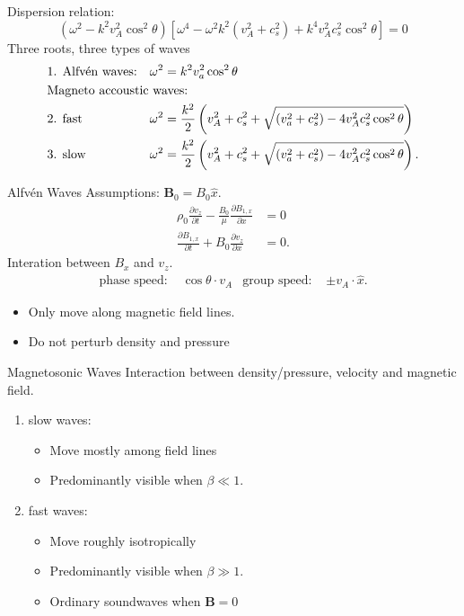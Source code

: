 \documentclass{beamer}
\begin{document}
\begin{frame}
    Dispersion relation:
        \begin{equation*}
	        (\omega^2 - k^2 v_A^2 \cos^2 \theta)\left[ \omega^{4} - \omega^2k^2(v_A^2 + c_s^2) + k^{4}v_A^2c_s^2\cos^2\theta \right]  = 0
        \end{equation*}
Three roots, three types of waves
\begin{align*}
&\text{1. Alfv\'en waves:}	& \omega^2 &= k^2 v_a^2 \cos^2 \theta\\
&\text{Magneto accoustic waves:}\hspace{-4cm}\\
&\text{2. fast} 
& \omega^2 &= \frac{k^2}{2}\left( v_A^2 + c_s^2 + \sqrt{(v_a^2 + c_s^2) - 4 v_A^2 c_s^2 \cos^2\theta}  \right) \\
& \text{3. slow} & 
	\omega^2 &= \frac{k^2}{2}\left( v_A^2 + c_s^2 + \sqrt{(v_a^2 + c_s^2) - 4 v_A^2 c_s^2 \cos^2\theta}  \right) 
.\end{align*}
\end{frame}
\begin{frame}{Alfv\'en Waves}
	Assumptions: $\mathbf B_0 = B_0 \hat{x}$. 
	\begin{align*}
		\rho_0 \frac{\partial v_z}{\partial t}  - \frac{B_0}{\mu}\frac{\partial B_{1, x}}{\partial x}  &= 0 \\
		\frac{\partial B_{1,x}}{\partial t}  + B_0 \frac{\partial v_z}{\partial x} &= 0 
	.\end{align*}
	Interation between $B_x$ and $v_z$. 
	\begin{align*}
		\text{phase speed: } & \cos\theta \cdot v_A & \text{group speed: } & \pm v_A \cdot \hat{x}
	.\end{align*}
	\begin{itemize}
		\item Only move along magnetic field lines.
		\item Do not perturb density and pressure
	\end{itemize}
\end{frame}
\begin{frame}{Magnetosonic Waves}
	Interaction between density/pressure, velocity and magnetic field. 
	\begin{enumerate}
		\item slow waves:
			\begin{itemize}
				\item Move mostly among field lines
				\item Predominantly visible when $\beta \ll 1$.
			\end{itemize}
		\item fast waves:
			\begin{itemize}
				\item Move roughly isotropically 
				\item Predominantly visible when $\beta \gg 1$.
				\item Ordinary soundwaves when $\mathbf B = 0$
			\end{itemize}
	\end{enumerate}
\end{frame}
\end{document}
